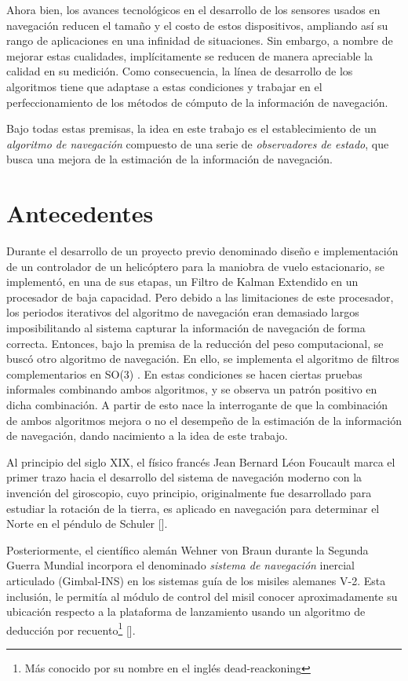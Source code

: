 \documentclass[10pt]{report}
\numberwithin{equation}{chapter}
\numberwithin{algorithm}{chapter}
\newcommand{\bcite}[1]{[\cite{#1}]}
\begin{document}
Ahora bien, los avances tecnológicos en el desarrollo de los sensores usados en navegación reducen el tamaño y el costo de estos dispositivos, ampliando así su rango de aplicaciones en una infinidad de situaciones. Sin embargo, a nombre de mejorar estas cualidades, implícitamente se reducen de manera apreciable la calidad en su medición. Como consecuencia, la línea de desarrollo de los algoritmos tiene que adaptase a estas condiciones y trabajar en el perfeccionamiento de los métodos de cómputo de la información de navegación.\par
Bajo todas estas premisas, la idea en este trabajo es el establecimiento de un \emph{algoritmo de navegación} compuesto de una serie de \emph{observadores de estado}, que busca una mejora de la estimación de la información de navegación.\par
\section{Antecedentes}
Durante el desarrollo de un proyecto previo denominado diseño e implementación de un controlador de un helicóptero para la maniobra de vuelo estacionario, se implementó, en una de sus etapas, un Filtro de Kalman Extendido en un procesador de baja capacidad. Pero debido a las limitaciones de este procesador, los periodos iterativos del algoritmo de navegación eran demasiado largos imposibilitando al sistema capturar la información de navegación de forma correcta. Entonces, bajo la premisa de la reducción del peso computacional, se buscó otro algoritmo de navegación. En ello, se implementa el algoritmo de filtros complementarios en SO(3) . En estas condiciones se hacen ciertas pruebas informales combinando ambos algoritmos, y se observa un patrón positivo en dicha combinación. A partir de esto nace la interrogante de que la combinación de ambos algoritmos mejora o no el desempeño de la estimación de la información de navegación, dando nacimiento a la idea de este trabajo. \par
Al principio del siglo XIX, el físico francés Jean Bernard Léon Foucault marca el primer trazo hacia el desarrollo del sistema de navegación moderno con la invención del giroscopio, cuyo principio, originalmente fue desarrollado para estudiar la rotación de la tierra, es aplicado en navegación para determinar el Norte en el péndulo de Schuler \bcite{Schuler1923}. \par
Posteriormente, el científico alemán Wehner von Braun durante la Segunda Guerra Mundial incorpora el denominado \emph{sistema de navegación} inercial articulado (Gimbal-INS) en los sistemas guía de los misiles alemanes V-2. Esta inclusión, le permitía al módulo de control del misil conocer aproximadamente su ubicación respecto a la plataforma de lanzamiento usando un algoritmo de deducción por recuento\footnote{Más conocido por su nombre en el inglés dead-reackoning} \bcite{Jekeli2001}. \par
\end{document}
